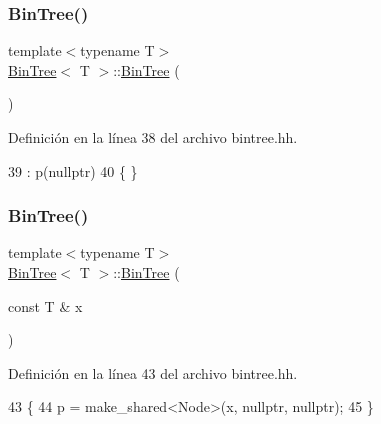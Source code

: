 \subsubsection{\texorpdfstring{Bin\+Tree()}{BinTree()}\hspace{0.1cm}{\footnotesize\ttfamily [1/3]}}
{\footnotesize\ttfamily template$<$typename T$>$ \\
\hyperlink{class_bin_tree}{Bin\+Tree}$<$ T $>$\+::\hyperlink{class_bin_tree}{Bin\+Tree} (\begin{DoxyParamCaption}{ }\end{DoxyParamCaption})}



Definición en la línea 38 del archivo bintree.\+hh.


\begin{DoxyCode}
39     :   p(\textcolor{keyword}{nullptr})
40     \{   \}
\end{DoxyCode}
\mbox{\label{class_bin_tree_a1ab686e0bcf990093ff91fe71744c1a4}} 
\subsubsection{\texorpdfstring{Bin\+Tree()}{BinTree()}\hspace{0.1cm}{\footnotesize\ttfamily [2/3]}}
{\footnotesize\ttfamily template$<$typename T$>$ \\
\hyperlink{class_bin_tree}{Bin\+Tree}$<$ T $>$\+::\hyperlink{class_bin_tree}{Bin\+Tree} (\begin{DoxyParamCaption}\item[{const T \&}]{x }\end{DoxyParamCaption})}



Definición en la línea 43 del archivo bintree.\+hh.


\begin{DoxyCode}
43                          \{
44         p = make\_shared<Node>(x, \textcolor{keyword}{nullptr}, \textcolor{keyword}{nullptr});
45     \}
\end{DoxyCode}
\mbox{\label{class_bin_tree_adb7eeff76d08130c943b36af215eb521}} 
